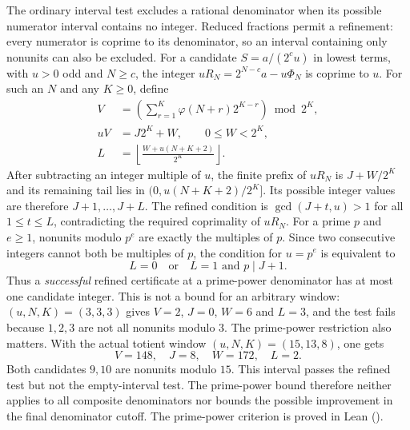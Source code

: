 \begin{obs}\label{prop:D8cert-kill}
The ordinary interval test excludes a rational denominator when its
possible numerator interval contains no integer. Reduced fractions
permit a refinement: every numerator is coprime to its denominator,
so an interval containing only nonunits can also be excluded.
For a candidate $S=a/(2^c u)$ in lowest terms, with $u>0$ odd
and $N\ge c$, the integer $uR_N=2^{N-c}a-u\Phi_N$ is coprime
to $u$. For such an $N$ and any $K\ge0$, define
\[
 \begin{aligned}
 V&=\left(\sum_{r=1}^{K}\varphi(N+r)2^{K-r}\right)\bmod2^K,\\
 uV&=J2^K+W,\qquad 0\le W<2^K,\\
 L&=\left\lfloor\frac{W+u(N+K+2)}{2^K}\right\rfloor.
 \end{aligned}
\]
After subtracting an integer multiple of $u$, the finite prefix
of $uR_N$ is $J+W/2^K$ and its remaining tail lies in
$(0,u(N+K+2)/2^K]$. Its possible integer values are therefore
$J+1,\ldots,J+L$. The refined condition is
$\gcd(J+t,u)>1$ for all $1\le t\le L$, contradicting the required
coprimality of $uR_N$.
For a prime $p$ and $e\ge1$, nonunits modulo $p^e$ are exactly the
multiples of $p$. Since two consecutive integers cannot both be
multiples of $p$, the condition for $u=p^e$ is equivalent to
\[
 L=0\quad\text{or}\quad L=1\text{ and }p\mid J+1.
\]
Thus a \emph{successful} refined certificate at a prime-power denominator
has at most one candidate integer. This is not a bound for an arbitrary
window: $(u,N,K)=(3,3,3)$ gives $V=2$, $J=0$, $W=6$ and $L=3$,
and the test fails because $1,2,3$ are not all nonunits modulo $3$.
The prime-power restriction also matters. With the actual totient
window $(u,N,K)=(15,13,8)$, one gets
\[
 V=148,\quad J=8,\quad W=172,\quad L=2.
\]
Both candidates $9,10$ are nonunits modulo $15$. This interval passes
the refined test but not the empty-interval test. The prime-power bound
therefore neither applies to all composite denominators nor bounds the
possible improvement in the final denominator cutoff.
The prime-power criterion is proved in Lean
().
\end{obs}

